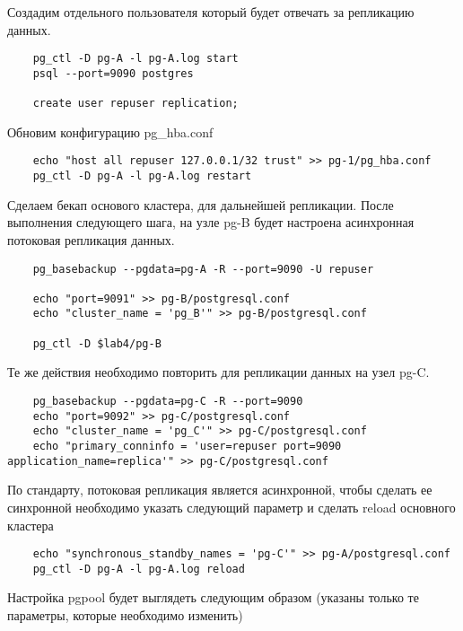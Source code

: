 \documentclass{article}
\begin{document}
Создадим отдельного пользователя который будет отвечать за репликацию данных.

\begin{verbatim}
    pg_ctl -D pg-A -l pg-A.log start
    psql --port=9090 postgres

    create user repuser replication;
\end{verbatim}

Обновим конфигурацию pg\_hba.conf

\begin{verbatim}
    echo "host all repuser 127.0.0.1/32 trust" >> pg-1/pg_hba.conf
    pg_ctl -D pg-A -l pg-A.log restart
\end{verbatim}

Сделаем бекап основого кластера, для дальнейшей репликации. После выполнения следующего шага, на узле pg-B будет настроена асинхронная потоковая репликация данных.

\begin{verbatim}
    pg_basebackup --pgdata=pg-A -R --port=9090 -U repuser
    
    echo "port=9091" >> pg-B/postgresql.conf
    echo "cluster_name = 'pg_B'" >> pg-B/postgresql.conf

    pg_ctl -D $lab4/pg-B
\end{verbatim}

Те же действия необходимо повторить для репликации данных на узел pg-C.

\begin{verbatim}
    pg_basebackup --pgdata=pg-C -R --port=9090
    echo "port=9092" >> pg-C/postgresql.conf
    echo "cluster_name = 'pg_C'" >> pg-C/postgresql.conf
    echo "primary_conninfo = 'user=repuser port=9090 application_name=replica'" >> pg-C/postgresql.conf
\end{verbatim}

По стандарту, потоковая репликация является асинхронной, чтобы сделать ее синхронной необходимо указать следующий параметр и сделать reload основного кластера

\begin{verbatim}
    echo "synchronous_standby_names = 'pg-C'" >> pg-A/postgresql.conf
    pg_ctl -D pg-A -l pg-A.log reload
\end{verbatim}

Настройка pgpool будет выглядеть следующим образом (указаны только те параметры, которые необходимо изменить)
\end{document}
